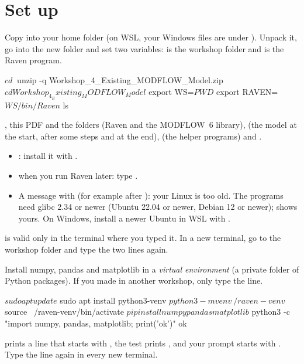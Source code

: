 \section{Set up}

\label{st:unpack}
Copy  into your home folder (on WSL, your Windows files are under
). Unpack it, go into the new folder and set two variables:  is the workshop folder and 
is the Raven program.
\begin{shell}
$ cd ~
$ unzip -q Workshop_4_Existing_MODFLOW_Model.zip
$ cd Workshop_4_Existing_MODFLOW_Model
$ export WS=$PWD
$ export RAVEN=$WS/bin/Raven
$ ls
\end{shell}
\see {}, this PDF and the folders  (Raven and the MODFLOW~6 library),  (the model at the
start, after some steps and at the end),  (the helper programs) and .
\begin{trouble}
\begin{itemize}
\item {}: install it with .
\item {} when you run Raven later: type .
\item A message with  (for example after ): your Linux is too old. The programs need glibc 2.34 or newer (Ubuntu 22.04 or newer, Debian 12 or newer);  shows yours. On Windows, install a newer Ubuntu in WSL with .
\end{itemize}
\end{trouble}
\begin{note}
 is valid only in the terminal where you typed it. In a new terminal, go to the workshop folder and type the
two  lines again.
\end{note}

\label{st:python}
Install numpy, pandas and matplotlib in a \emph{virtual environment} (a private folder of Python packages). If you made
 in another workshop, only type the  line.
\begin{shell}
$ sudo apt update
$ sudo apt install python3-venv
$ python3 -m venv ~/raven-venv
$ source ~/raven-venv/bin/activate
$ pip install numpy pandas matplotlib
$ python3 -c "import numpy, pandas, matplotlib; print('ok')"
ok
\end{shell}
\see {} prints a line that starts with , the test prints , and your prompt starts
with . Type the  line again in every new terminal.
